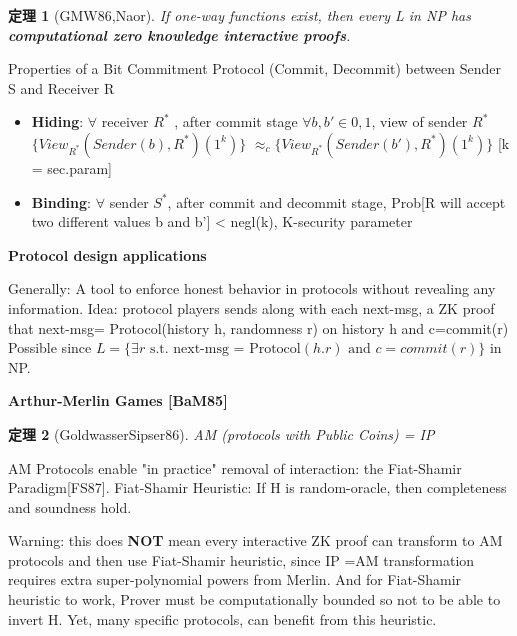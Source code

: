 \documentclass[10pt]{ctexart}
\newtheorem{theorem}{定理}
\begin{document}
\begin{theorem}[GMW86,Naor]
	If one-way functions exist, then every L in NP has \textbf{computational zero knowledge interactive proofs}.
\end{theorem}

Properties of a Bit Commitment Protocol (Commit, Decommit) between Sender S and Receiver R
\begin{itemize}
	\item \textbf{Hiding}: $\forall$ receiver $R^*$ , after {\color{blue} commit} stage $\forall b, b' \in {0,1}$, view of sender $R^*$ $\{ View_{R^*}(Sender(b),R^*)(1^k)\}$ $ \approx_c  \{ View_{R^*}(Sender(b'),R^*)(1^k)\}$ [k = sec.param]
	\item \textbf{Binding}: $\forall$ sender $S^*$, after {\color{blue} commit} and {\color{blue} decommit stage}, Prob[R will accept two different values b and b’] < negl(k), K-security parameter
\end{itemize}

\textbf{Protocol design applications}

Generally: A tool to enforce honest behavior {\color{violet}in protocols} without revealing any information. Idea: protocol players sends along with each next-msg, a ZK proof that next-msg= Protocol(history h, randomness r) on history h and c=commit(r) Possible since {\color{violet}$L=\{\exists r \text{ s.t. next-msg = Protocol}(h.r) \text{ and } c = commit(r)\}$} in NP.

\textbf{Arthur-Merlin Games [BaM85]}
\begin{theorem}[GoldwasserSipser86]
	AM (protocols with Public Coins) = IP
\end{theorem}
AM Protocols enable "in practice" removal of interaction: the Fiat-Shamir Paradigm[FS87].
Fiat-Shamir Heuristic:
If H is random-oracle, then completeness and soundness hold.

Warning: this does \textbf{NOT} mean every interactive ZK proof can transform to AM
protocols and then use Fiat-Shamir heuristic, since IP =AM transformation requires extra super-polynomial powers from Merlin. And for Fiat-Shamir heuristic to work, Prover must be computationally bounded so not to be able to invert H. Yet, many specific protocols, can benefit from this heuristic.
\end{document}
